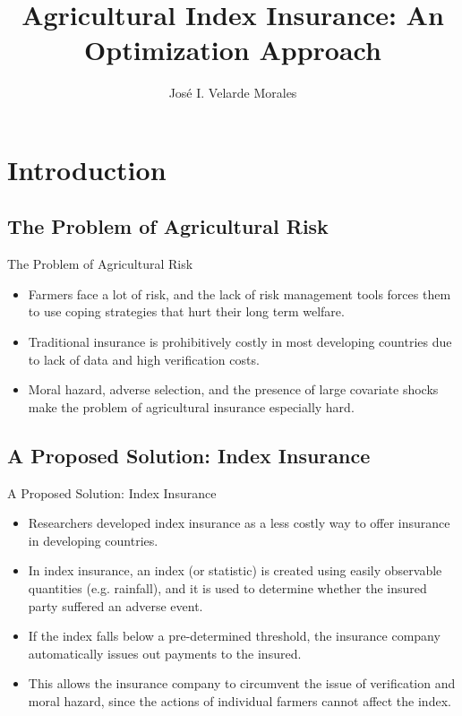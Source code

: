 \documentclass{beamer}
\title[Agricultural Index Insurance]{Agricultural Index Insurance: An Optimization Approach}
\author[José I. Velarde Morales]{José I. Velarde Morales}
\institute[Chicago Booth]
{

  University of Chicago\\
  Booth School of Business

}
\begin{document}
\frame{\titlepage}
\section{Introduction}

\subsection{The Problem of Agricultural Risk}
\begin{frame}{The Problem of Agricultural Risk}
\begin{itemize}
    \setlength\itemsep{2em}
    \item Farmers face a lot of risk, and the lack of risk management tools forces them to use coping strategies that hurt their long term welfare.
   
    \item Traditional insurance is prohibitively costly in most developing countries due to lack of data and high verification costs.

    \item Moral hazard, adverse selection, and the presence of large covariate shocks make the problem of agricultural insurance especially hard. 
\end{itemize}
\end{frame}

\subsection{A Proposed Solution: Index Insurance}
\begin{frame}{A Proposed Solution: Index Insurance}
\begin{itemize}
   \setlength\itemsep{1em}
    \item Researchers developed index insurance as a less costly way to offer insurance in developing countries. 
    \item In index insurance, an index (or statistic) is created using easily observable quantities (e.g. rainfall), and it is used to determine whether the insured party suffered an adverse event. 
    \item If the index falls below a pre-determined threshold, the insurance company automatically issues out payments to the insured. 
    \item This allows the insurance company to circumvent the issue of verification and moral hazard, since the actions of individual farmers cannot affect the index.
\end{itemize}
\end{frame}
\end{document}
